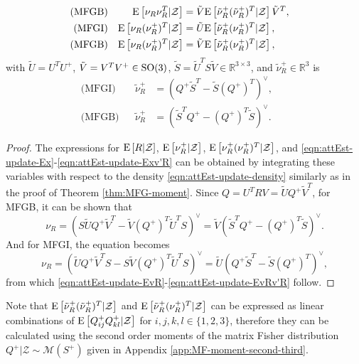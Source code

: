 \begin{theorem}
\begin{subequations}
\begin{flalign}
			\text{(MFGB)} && \expect{\nu_R\nu_R^T|\mathcal{Z}} &= \tilde{V} \expect{\tilde{\nu}^+_R(\tilde{\nu}^+_R)^T|\mathcal{Z}} \tilde{V}^T, && \\  \StepSubequations
			\text{(MFGI)} && \expect{\nu_R(\nu_R^+)^T|\mathcal{Z}} &= \tilde{U} \expect{\tilde{\nu}_R^+(\nu_R^+)^T|\mathcal{Z}}, && \\
			\text{(MFGB)} && \expect{\nu_R(\nu_R^+)^T|\mathcal{Z}} &= \tilde{V} \expect{\tilde{\nu}_R^+(\nu_R^+)^T|\mathcal{Z}}, && \label{eqn:attEst-update-EvRv'R}
		\end{flalign}
	\end{subequations}
	with $\tilde U = U^TU^+$, $\tilde V = V^TV^+\in\mathrm{SO}(3)$, $\tilde{S} = \tilde U^T{S}\tilde V\in\mathbb{R}^{3\times 3}$, and $\tilde\nu^+_R\in\mathbb{R}^3$ is
	\begin{subequations}
		\begin{flalign}
			\text{(MFGI)} && \tilde{\nu}^+_R &= (Q^+\tilde{S}^T-\tilde{S}(Q^+)^T)^\vee, && \\
			\text{(MFGB)} && \tilde{\nu}^+_R &= (\tilde{S}^TQ^+-(Q^+)^T\tilde{S})^\vee. &&
		\end{flalign}
	\end{subequations}
\end{theorem}
\begin{proof}
	The expressions for $\mathrm{E}\left[ R \lvert \mathcal{Z} \right]$, $\mathrm{E}\left[ \nu^+_R \lvert \mathcal{Z} \right]$, $\mathrm{E}\left[ \nu^+_R(\nu^+_R)^T \lvert \mathcal{Z} \right]$, and \eqref{eqn:attEst-update-Ex}-\eqref{eqn:attEst-update-Exv'R} can be obtained by integrating these variables with respect to the density \eqref{eqn:attEst-update-density} similarly as in the proof of Theorem \ref{thm:MFG-moment}.
	Since $ Q = U^T R V = \tilde U Q^+ \tilde V^T$, for MFGB, it can be shown that
	\begin{equation*}
		\nu_R = (S\tilde UQ^+\tilde V^T-\tilde V(Q^+)^T \tilde U^TS)^\vee = \tilde{V}(\tilde{S}^TQ^+-(Q^+)^T\tilde{S})^\vee.
	\end{equation*}
	And for MFGI, the equation becomes
	\begin{equation*}
		\nu_R = (\tilde UQ^+\tilde V^TS-S\tilde V(Q^+)^T \tilde U^TS)^\vee = \tilde{U}(Q^+\tilde{S}^T-\tilde{S}(Q^+)^T)^\vee,
	\end{equation*}
	from which \eqref{eqn:attEst-update-EvR}-\eqref{eqn:attEst-update-EvRv'R} follow.
\end{proof}

Note that $\mathrm{E}\left[ \tilde{\nu}_R^+ (\tilde{\nu}_R^+)^T \lvert \mathcal{Z} \right]$ and $\mathrm{E}\left[ \tilde{\nu}_R^+ (\nu_R^+)^T \lvert \mathcal{Z} \right]$ can be expressed as linear combinations of $\mathrm{E}\left[ Q^+_{ij}Q^+_{kl} \lvert \mathcal{Z} \right]$ for $i,j,k,l\in\{1,2,3\}$, therefore they can be calculated using the second order moments of the matrix Fisher distribution $Q^+\lvert\mathcal{Z} \sim \mathcal{M}(S^+)$ given in Appendix \ref{app:MF-moment-second-third}.

